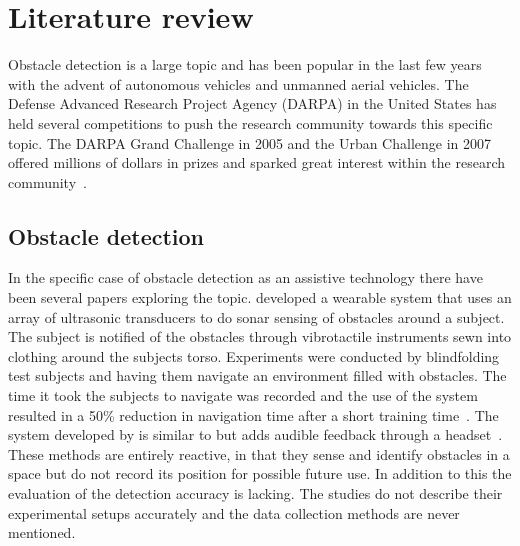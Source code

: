 \documentclass[prodmode,acmtosem]{acmsmall} %
\begin{document}
\section{Literature review} %
Obstacle detection is a large topic and has been popular in the last few years with the advent of autonomous vehicles and unmanned aerial vehicles.
The Defense Advanced Research Project Agency (DARPA) in the United States has held several competitions to push the research community towards this specific topic. The DARPA Grand Challenge in 2005 and the Urban Challenge in 2007 offered millions of dollars in prizes and sparked great interest within the research community~\cite{DARPAGrandChallenge2005,DARPAUrbanChallenge2007}.
\subsection{Obstacle detection}
In the specific case of obstacle detection as an assistive technology there have been several papers exploring the topic. \citet{Cardin2007} developed a wearable system that uses an array of ultrasonic transducers to do sonar sensing of obstacles around a subject. The subject is notified of the obstacles through vibrotactile instruments sewn into clothing around the subjects torso. Experiments were conducted by blindfolding test subjects and having them navigate an environment filled with obstacles. The time it took the subjects to navigate was recorded and the use of the system resulted in a 50\% reduction in navigation time after a short training time~\cite{Cardin2007}. The system developed by \citet{Shin2007} is similar to \citet{Cardin2007} but adds audible feedback through a headset~\cite{Shin2007}. These methods are entirely reactive, in that they sense and identify obstacles in a space but do not record its position for possible future use. In addition to this the evaluation of the detection accuracy is lacking. The studies do not describe their experimental setups accurately and the data collection methods are never mentioned. 
\end{document}
